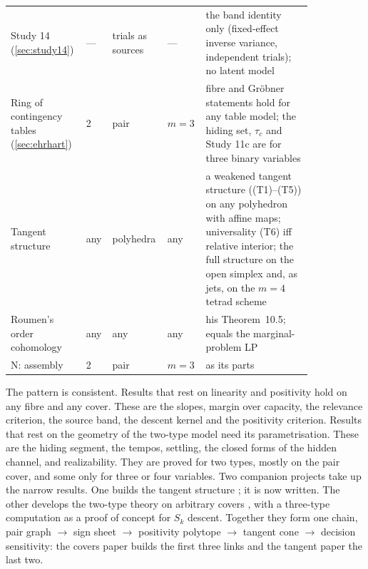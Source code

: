 \documentclass[11pt]{article}
\theoremstyle{definition}\newtheorem{definition}{Definition}\newtheorem{remark}{Remark}
\begin{document}
{\begin{longtable}{p{0.19\linewidth}p{0.06\linewidth}p{0.15\linewidth}p{0.1\linewidth}p{0.34\linewidth}}
Study 14 (\cref{sec:study14}) & --- & trials as sources & --- & the band identity only (fixed-effect inverse variance, independent trials); no latent model\\
Ring of contingency tables (\cref{sec:ehrhart}) & 2 & pair & $m=3$ & fibre and Gr\"obner statements hold for any table model; the hiding set, $\tau_c$ and Study 11c are for three binary variables\\
Tangent structure \cite{TangentCompanion} & any & polyhedra & any & a weakened tangent structure ((T1)--(T5)) on any polyhedron with affine maps; universality (T6) iff relative interior; the full structure on the open simplex and, as jets, on the $m=4$ tetrad scheme\\
Roumen's order cohomology & any & any & any & his Theorem~10.5; equals the marginal-problem LP\\
N: assembly & 2 & pair & $m=3$ & as its parts\\\bottomrule
\end{longtable}}

The pattern is consistent. Results that rest on linearity and positivity hold on any fibre and any cover. These are the slopes, margin
over capacity, the relevance criterion, the source band, the descent kernel and the positivity criterion. Results that rest on the
geometry of the two-type model need its parametrisation. These are the hiding segment, the tempos, settling, the closed forms of the
hidden channel, and realizability. They are proved for two types, mostly on the pair cover, and some only for three or four variables.
Two companion projects take up the narrow results. One builds the tangent structure \cite{TangentCompanion}; it is now written. The other develops the
two-type theory on arbitrary covers \cite{CoversCompanion}, with a three-type computation as a proof of concept for $S_k$ descent. Together they form one
chain, pair graph $\to$ sign sheet $\to$ positivity polytope $\to$ tangent cone $\to$ decision sensitivity: the covers paper builds
the first three links and the tangent paper the last two.
\end{document}
